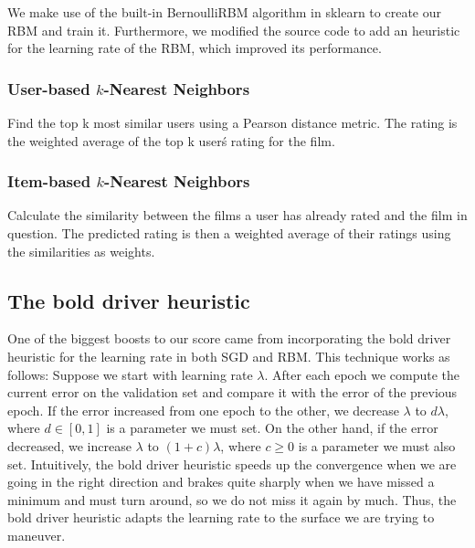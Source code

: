 \documentclass[10pt,conference,compsocconf]{IEEEtran}
\begin{document}
We make use of the built-in BernoulliRBM algorithm in sklearn to create our RBM and train it. Furthermore, we modified the source code to add an heuristic for the learning rate of the RBM, which improved its performance.



\subsubsection*{\textbf{User-based $k$-Nearest Neighbors}} Find the top k most similar users using a Pearson distance metric. The rating is the weighted average of the top k user\'s rating for the film.

\subsubsection*{\textbf{Item-based $k$-Nearest Neighbors}}  Calculate the similarity between the films a user has already rated and the film in question. The predicted rating is then a weighted average of their ratings using the similarities as weights.

\subsection{The bold driver heuristic} 
One of the biggest boosts to our score came from incorporating the bold driver heuristic for the learning rate in both SGD and RBM. This technique works as follows: Suppose we start with learning rate $\lambda$. After each epoch we compute the current error on the validation set and compare it with the error of the previous epoch. If the error increased from one epoch to the other, we decrease $\lambda$ to $d\lambda$, where $d\in[0,1]$ is a parameter we must set. On the other hand, if the error decreased, we increase $\lambda$ to $(1+c)\lambda$, where $c\geq 0$ is a parameter we must also set. Intuitively, the bold driver heuristic speeds up the convergence when we are going in the right direction and brakes quite sharply when we have missed a minimum and must turn around, so we do not miss it again by much. Thus, the bold driver heuristic adapts the learning rate to the surface we are trying to maneuver.
\end{document}
